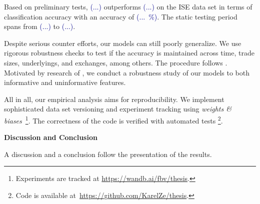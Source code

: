 Based on preliminary tests, \textcolor{darkblue}{(...)} outperforms \textcolor{darkblue}{(...)} on the \gls{ISE} data set in terms of classification accuracy with an accuracy of \textcolor{darkblue}{(...~\%)}. The static testing period spans from \textcolor{darkblue}{(...)} to \textcolor{darkblue}{(...)}.


Despite serious counter efforts, our models can still poorly generalize. We use rigorous robustness checks to test if the accuracy is maintained across time, trade sizes, underlyings, and exchanges, among others. The procedure follows \textcites{chakrabartyTradeClassificationAlgorithms2012}{grauerOptionTradeClassification2022}{ronenMachineLearningTrade2022}{savickasInferringDirectionOption2003}. Motivated by research of \textcite{grinsztajnWhyTreebasedModels2022}, we conduct a robustness study of our models to both informative and uninformative features.

All in all, our empirical analysis aims for reproducibility. We implement sophisticated data set versioning and experiment tracking using \textit{weights \& biases}~\footnote{Experiments are tracked at \url{https://wandb.ai/fbv/thesis}.}. The correctness of the code is verified with automated tests \footnote{Code is available at~\url{https://github.com/KarelZe/thesis}.}. 

\textbf{Discussion and Conclusion}

A discussion and a conclusion follow the presentation of the results.


